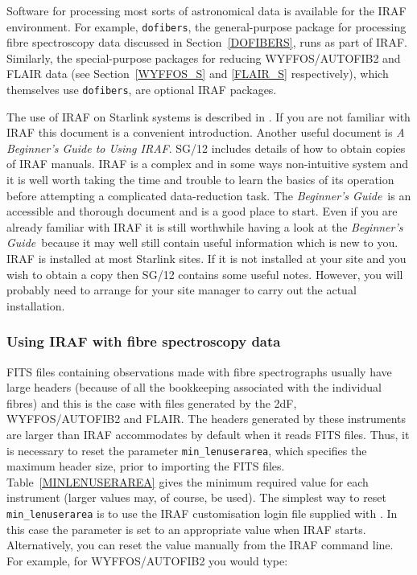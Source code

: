\documentclass[twoside,11pt]{starlink}
\begin{document}
Software for processing most sorts of astronomical data is available
for the IRAF environment.  For example, \texttt{dofibers}, the
general-purpose package for processing fibre spectroscopy data
discussed in Section~\ref{DOFIBERS}, runs as part of IRAF.  Similarly,
the special-purpose packages for reducing WYFFOS/AUTOFIB2 and FLAIR
data (see Section~\ref{WYFFOS_S} and \ref{FLAIR_S} respectively),
which themselves use \texttt{dofibers}, are optional IRAF packages.

The use of IRAF on Starlink systems is described in
\/\cite{SG12}.
If you are not familiar with IRAF this document is a convenient
introduction.  Another useful document is \textit{A Beginner's Guide to
Using IRAF}\/\cite{BARNES93}.  SG/12 includes details of how to obtain
copies of IRAF manuals.  IRAF is a complex and in some ways
non-intuitive system and it is well worth taking the time and trouble
to learn the basics of its operation before attempting a complicated
data-reduction task.  The \textit{Beginner's Guide}\, is an accessible and
thorough document and is a good place to start.  Even if you are already
familiar with IRAF it is still worthwhile having a look at the \textit{Beginner's Guide}\, because it may well still contain useful information
which is new to you.  IRAF is installed at most Starlink sites.
If it is not installed at your site and you wish to obtain a copy then
SG/12 contains some useful notes.  However, you will probably need to
arrange for your site manager to carry out the actual installation.

\subsubsection{\label{IRAFIBSP}Using IRAF with fibre spectroscopy data}

FITS files containing observations made with fibre spectrographs
usually have large headers (because of all the bookkeeping associated
with the individual fibres) and this is the case with files generated
by the 2dF, WYFFOS/AUTOFIB2 and FLAIR.  The headers generated by these
instruments are larger than IRAF accommodates by default when it reads
FITS files.  Thus, it is necessary to reset the parameter \texttt{min\_lenuserarea}, which specifies the maximum header size, prior
to importing the FITS files.  Table~\ref{MINLENUSERAREA} gives the
minimum required value for each instrument (larger values may, of
course, be used).  The simplest way to reset \texttt{min\_lenuserarea} is
to use the IRAF customisation login file supplied with
\/\cite{SG12}.  In this case the parameter is set
to an appropriate value when IRAF starts.  Alternatively, you can reset
the value manually from the IRAF command line.  For example, for
WYFFOS/AUTOFIB2 you would type:
\end{document}
